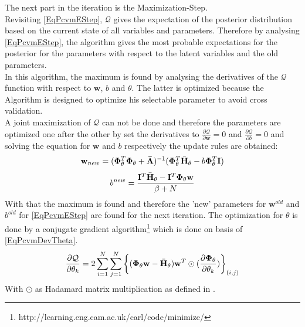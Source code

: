 The next part in the iteration is the Maximization-Step.\cite{Chen.2009}\\
Revisiting \ref{EqPcvmEStep}, $\mathcal{Q}$ gives the expectation of the posterior distribution based on the current state of all variables and parameters. 
Therefore by analysing \ref{EqPcvmEStep}, the algorithm gives the most probable expectations for the posterior for the parameters with respect to the latent variables and the old parameters. \\
In this algorithm, the maximum is found by analysing the derivatives of the $\mathcal{Q}$ function with respect to $\mathbf{w}$, $b$ and $\theta$.
The latter is optimized because the Algorithm is designed to optimize his selectable parameter to avoid cross validation.\cite{Chen.2009}\\
A joint maximization of $\mathcal{Q}$ can not be done and therefore the parameters are optimized one after the other by set the derivatives to $\frac{\partial \mathcal{Q}}{\partial \mathbf{w}} = 0$ and $\frac{\partial \mathcal{Q}}{\partial b} = 0$ and solving the equation for $\mathbf{w}$ and $b$ respectively the update rules are obtained:\cite{Chen.2009}
\begin{equation}\label{EqPcvmUpdateW}
	\mathbf{w}_{new} = (\mathbf{\Phi}_\theta^T \mathbf{\Phi}_\theta + \mathbf{\bar{A}})^{-1} (\mathbf{\Phi}_\theta^T \bar{\mathbf{H}}_\theta - b\mathbf{\Phi}_\theta^T \mathbf{I})
\end{equation}
\begin{equation}\label{EqPcvmUpdateb}
	b^{new} = \frac{\mathbf{I}^T \bar{\mathbf{H}}_\theta - \mathbf{I}^T \mathbf{\Phi}_\theta \mathbf{w}}{\beta + N}
\end{equation}
With that the maximum is found and therefore the 'new' parameters for $\mathbf{w}^{old}$ and $b^{old}$ for \ref{EqPcvmEStep} are found for the next iteration.
The optimization for $\theta$ is done by a conjugate gradient algorithm\footnote{http://learning.eng.cam.ac.uk/carl/code/minimize/} which is done on basis of \eqref{EqPcvmDevTheta}.\cite{Chen.2009}
\begin{equation}\label{EqPcvmDevTheta}
	\frac{\partial \mathcal{Q}}{\partial \mathbf{\theta}_k } = 2 \sum_{i=1}^{N}\sum_{j=1}^{N} \bigg\{ (\mathbf{\Phi}_\theta \mathbf{w} - \bar{\mathbf{H}}_\theta) \mathbf{w}^T \odot (\frac{\partial\mathbf{\Phi}_\theta}{\partial \theta_k} ) \bigg\}_{(i,j)}
\end{equation}
With $\odot$ as Hadamard matrix multiplication as defined in \cite{CaroLopera.2012}.\newline

